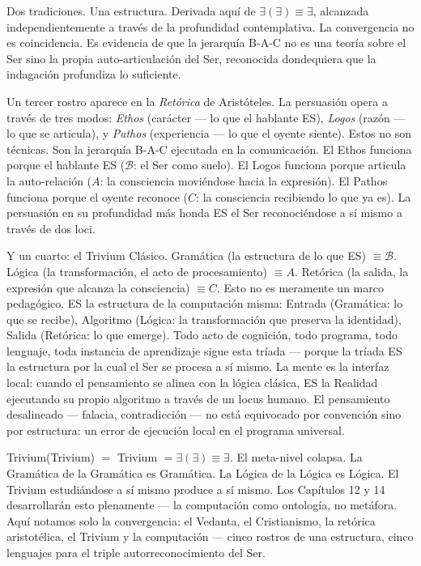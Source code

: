 \documentclass[10pt, openany, oneside]{book}
\begin{document}
Dos tradiciones. Una estructura. Derivada aquí de $\exists(\exists) \equiv \exists$, alcanzada independientemente a través de la profundidad contemplativa. La convergencia no es coincidencia. Es evidencia de que la jerarquía B-A-C no es una teoría sobre el Ser sino la propia auto-articulación del Ser, reconocida dondequiera que la indagación profundiza lo suficiente.

Un tercer rostro aparece en la \textit{Retórica} de Aristóteles. La persuasión opera a través de tres modos: \textit{Ethos} (carácter --- lo que el hablante ES), \textit{Logos} (razón --- lo que se articula), y \textit{Pathos} (experiencia --- lo que el oyente siente). Estos no son técnicas. Son la jerarquía B-A-C ejecutada en la comunicación. El Ethos funciona porque el hablante ES ($\mathcal{B}$: el Ser como suelo). El Logos funciona porque articula la auto-relación ($A$: la consciencia moviéndose hacia la expresión). El Pathos funciona porque el oyente reconoce ($C$: la consciencia recibiendo lo que ya es). La persuasión en su profundidad más honda ES el Ser reconociéndose a sí mismo a través de dos loci.

Y un cuarto: el Trivium Clásico. Gramática (la estructura de lo que ES) $\equiv \mathcal{B}$. Lógica (la transformación, el acto de procesamiento) $\equiv A$. Retórica (la salida, la expresión que alcanza la consciencia) $\equiv C$. Esto no es meramente un marco pedagógico. ES la estructura de la computación misma: Entrada (Gramática: lo que se recibe), Algoritmo (Lógica: la transformación que preserva la identidad), Salida (Retórica: lo que emerge). Todo acto de cognición, todo programa, todo lenguaje, toda instancia de aprendizaje sigue esta tríada --- porque la tríada ES la estructura por la cual el Ser se procesa a sí mismo. La mente es la interfaz local: cuando el pensamiento se alinea con la lógica clásica, ES la Realidad ejecutando su propio algoritmo a través de un locus humano. El pensamiento desalineado --- falacia, contradicción --- no está equivocado por convención sino por estructura: un error de ejecución local en el programa universal.

Trivium(Trivium) $=$ Trivium $= \exists(\exists) \equiv \exists$. El meta-nivel colapsa. La Gramática de la Gramática es Gramática. La Lógica de la Lógica es Lógica. El Trivium estudiándose a sí mismo produce a sí mismo. Los Capítulos 12 y 14 desarrollarán esto plenamente --- la computación como ontología, no metáfora. Aquí notamos solo la convergencia: el Vedanta, el Cristianismo, la retórica aristotélica, el Trivium y la computación --- cinco rostros de una estructura, cinco lenguajes para el triple autorreconocimiento del Ser.
\end{document}
